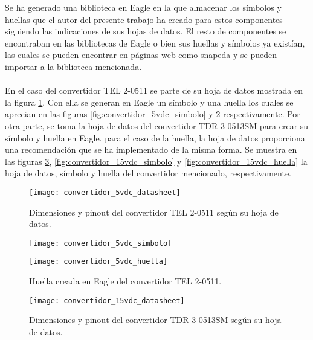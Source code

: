 Se ha generado una biblioteca en Eagle en la que almacenar los símbolos y huellas que el autor del presente trabajo ha creado para estos componentes siguiendo las indicaciones de sus hojas de datos. El resto de componentes se encontraban en las bibliotecas de Eagle o bien sus huellas y símbolos ya existían, las cuales se pueden encontrar en páginas web como snapeda\cite{snapeda} y se pueden importar a la biblioteca mencionada.
\\
\\
En el caso del convertidor TEL 2-0511 se parte de su hoja de datos mostrada en la figura \ref{fig:convertidor_5vdc_datasheet}. Con ella se generan en Eagle un símbolo y una huella los cuales se aprecian en las figuras \ref{fig:convertidor_5vdc_simbolo} y \ref{fig:convertidor_5vdc_huella} respectivamente. Por otra parte, se toma la hoja de datos del convertidor TDR 3-0513SM para crear su símbolo y huella en Eagle. para el caso de la huella, la hoja de datos proporciona una recomendación que se ha implementado de la misma forma. Se muestra en las figuras \ref{fig:convertidor_15vdc_datasheet}, \ref{fig:convertidor_15vdc_simbolo} y \ref{fig:convertidor_15vdc_huella} la hoja de datos, símbolo y huella del convertidor mencionado, respectivamente.\\

\begin{figure}[!htb]
\centering
\texttt{[image: convertidor\_5vdc\_datasheet]}
  \caption{Dimensiones y pinout del convertidor TEL 2-0511 según su hoja de datos.}\label{fig:convertidor_5vdc_datasheet}
\end{figure}

\begin{figure}[!htb]
  \texttt{[image: convertidor\_5vdc\_simbolo]}
  \caption{Símbolo creado en Eagle del convertidor TEL 2-0511.}\label{fig:convertidor_5vdc_simbolo}
\endminipage\hfill
{}
  \texttt{[image: convertidor\_5vdc\_huella]}
  \caption{Huella creada en Eagle del convertidor TEL 2-0511.}\label{fig:convertidor_5vdc_huella}
\endminipage\hfill
\end{figure}

\begin{figure}[!htb]
\centering
\texttt{[image: convertidor\_15vdc\_datasheet]}
  \caption{Dimensiones y pinout del convertidor TDR 3-0513SM según su hoja de datos.}\label{fig:convertidor_15vdc_datasheet}
\end{figure}

